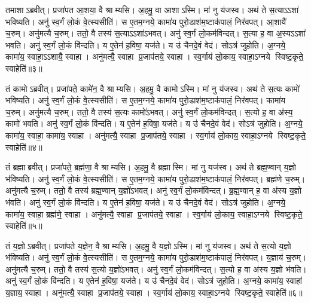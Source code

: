    तमाशाऽब्रवीत्।
   प्रजा॑पत आ॒शया॒ वै श्राम्यसि।
   अ॒हमु॒ वा आशाऽस्मि।
   मां नु य॑जस्व।
   अथ॑ ते स॒त्याऽऽशा॑ भविष्यति।
   अनु॑ स्व॒र्गं लो॒कं वे॒त्स्यसीति॑।
   स ए॒तम॒ग्नये॒ कामा॑य पुरो॒डाश॑म॒ष्टाक॑पालं॒ निर॑वपत्।
   आ॒शायै॑ च॒रुम्।
   अनु॑मत्यै च॒रुम्।
   ततो॒ वै तस्य॑ स॒त्याऽऽशा॑ऽभवत्।
   अनु॑ स्व॒र्गं लो॒कम॑विन्दत्।
   स॒त्या ह॒ वा अ॒स्यऽऽशा॑ भवति।
   अनु॑ स्व॒र्गं लो॒कं वि॑न्दति।
   य ए॒तेन॑ ह॒विषा॒ यज॑ते।
   य उ॑ चैनदे॒वं वेद॑।
   सोऽत्र॑ जुहोति।
   अ॒ग्नये॒ कामा॑य॒ स्वाहा॒ऽऽशायै॒ स्वाहा।
   अनु॑मत्यै॒ स्वाहा प्र॒जाप॑तये॒ स्वाहा।
   स्व॒र्गाय॑ लो॒काय॒ स्वाहा॒ऽग्नये स्विष्ट॒कृते॒ स्वाहेति॑॥३॥

   तं कामोऽब्रवीत्।
   प्रजा॑पते॒ कामे॑न॒ वै श्राम्यसि।
   अ॒हमु॒ वै कामोऽस्मि।
   मां नु य॑जस्व।
   अथ॑ ते स॒त्यः कामो॑ भविष्यति।
   अनु॑ स्व॒र्गं लो॒कं वे॒त्स्यसीति॑।
   स ए॒तम॒ग्नये॒ कामा॑य पुरो॒डाश॑म॒ष्टाक॑पालं॒ निर॑वपत्।
   कामा॑य च॒रुम्।
   अनु॑मत्यै च॒रुम्।
   ततो॒ वै तस्य॑ स॒त्यः कामो॑ऽभवत्।
   अनु॑ स्व॒र्गं लो॒कम॑विन्दत्।
   स॒त्यो ह॒ वा अ॑स्य॒ कामो॑ भवति।
   अनु॑ स्व॒र्गं लो॒कं वि॑न्दति।
   य ए॒तेन॑ ह॒विषा॒ यज॑ते।
   य उ॑ चैनदे॒वं वेद॑।
   सोऽत्र॑ जुहोति।
   अ॒ग्नये॒ कामा॑य॒ स्वाहा॒ कामा॑य॒ स्वाहा।
   अनु॑मत्यै॒ स्वाहा प्र॒जाप॑तये॒ स्वाहा।
   स्व॒र्गाय॑ लो॒काय॒ स्वाहा॒ऽग्नये स्विष्ट॒कृते॒ स्वाहेति॑॥४॥

   तं ब्रह्माब्रवीत्।
   प्रजा॑पते॒ ब्रह्म॑णा॒ वै श्राम्यसि।
   अ॒हमु॒ वै ब्रह्मास्मि।
   मां नु यज॑स्व।
   अथ॑ ते ब्रह्म॒ण्वान् य॒ज्ञो भ॑विष्यति।
   अनु॑ स्व॒र्गं लो॒कं वे॒त्स्यसीति॑।
   स ए॒तम॒ग्नये॒ कामा॑य पुरो॒डाश॑म॒ष्टाक॑पालं॒ निर॑वपत्।
   ब्रह्म॑णे च॒रुम्।
   अनु॑मत्यै च॒रुम्।
   ततो॒ वै तस्य॑ ब्रह्म॒ण्वान् य॒ज्ञो॑ऽभवत्।
   अनु॑ स्व॒र्गं लो॒कम॑विन्दत्।
   ब्र॒ह्म॒ण्वान् ह॒ वा अ॑स्य य॒ज्ञो भ॑वति।
   अनु॑ स्व॒र्गं लो॒कं वि॑न्दति।
   य ए॒तेन॑ ह॒विषा॒ यज॑ते।
   य उ॑ चैनदे॒वं वेद॑।
   सोऽत्र॑ जुहोति।
   अ॒ग्नये॒ कामा॑य॒ स्वाहा॒ ब्रह्म॑णे॒ स्वाहा।
   अनु॑मत्यै॒ स्वाहा प्र॒जाप॑तये॒ स्वाहा।
   स्व॒र्गाय॑ लो॒काय॒ स्वाहा॒ऽग्नये स्विष्ट॒कृते॒ स्वाहेति॑॥५॥

   तं य॒ज्ञोऽब्रवीत्।
   प्रजा॑पते य॒ज्ञेन॒ वै श्राम्यसि।
   अ॒हमु॒ वै य॒ज्ञोऽस्मि।
   मां नु य॑जस्व।
   अथ॑ ते स॒त्यो य॒ज्ञो भ॑विष्यति।
   अनु॑ स्व॒र्गं लो॒कं वे॒त्स्यसीति॑।
   स ए॒तम॒ग्नये॒ कामा॑य पुरो॒डाश॑म॒ष्टाक॑पालं॒ निर॑वपत्।
   य॒ज्ञाय॑ च॒रुम्।
   अनु॑मत्यै च॒रुम्।
   ततो॒ वै तस्य॑ स॒त्यो य॒ज्ञो॑ऽभवत्।
   अनु॑ स्व॒र्गं लो॒कम॑विन्दत्।
   स॒त्यो ह॒ वा अ॑स्य य॒ज्ञो भ॑वति।
   अनु॑ स्व॒र्गं लो॒कं वि॑न्दति।
   य ए॒तेन॑ ह॒विषा॒ यज॑ते।
   य उ॑ चैनदे॒वं वेद॑।
   सोऽत्र॑ जुहोति।
   अ॒ग्नये॒ कामा॑य॒ स्वाहा॑ य॒ज्ञाय॒ स्वाहा।
   अनु॑मत्यै॒ स्वाहा प्र॒जाप॑तये॒ स्वाहा।
   स्व॒र्गाय॑ लो॒काय॒ स्वाहा॒ऽग्नये स्विष्ट॒कृते॒ स्वाहेति॑॥६॥

